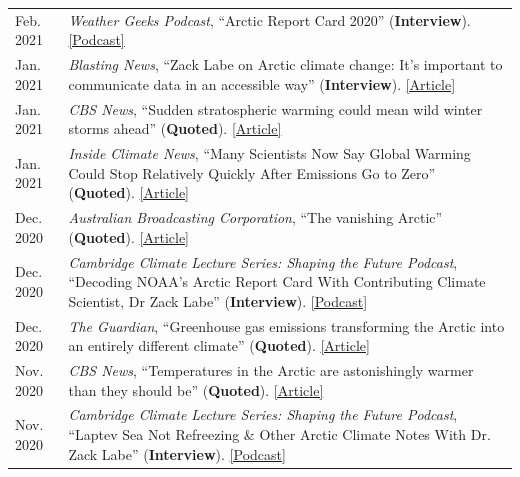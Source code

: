 \documentclass[margin,line,palatino,courier,10pt]{res}
\begin{document}
\begin{resume}
\begin{tabular}{@{}p{0.9in}p{4in}}
Feb. 2021 & \textit{Weather Geeks Podcast}, ``Arctic Report Card 2020'' (\textbf{Interview}). \href{https://podcasts.apple.com/us/podcast/arctic-report-card-2020/id1373312240?i=1000507537964}{[Podcast]}\\
Jan. 2021 & \textit{Blasting News}, ``Zack Labe on Arctic climate change: It's important to communicate data in an accessible way'' (\textbf{Interview}). \href{https://us.blastingnews.com/opinion/2021/01/zack-labe-on-arctic-climate-change-its-important-to-communicate-data-in-an-accessible-way-003267614.html}{[Article]}\\
Jan. 2021 & \textit{CBS News}, ``Sudden stratospheric warming could mean wild winter storms ahead'' (\textbf{Quoted}). \href{https://www.cbsnews.com/news/stratospheric-warming-winter-weather-coming/}{[Article]}\\
Jan. 2021 & \textit{Inside Climate News}, ``Many Scientists Now Say Global Warming Could Stop Relatively Quickly After Emissions Go to Zero'' (\textbf{Quoted}). \href{https://insideclimatenews.org/news/03012021/five-aspects-climate-change-2020/}{[Article]}\\
Dec. 2020 & \textit{Australian Broadcasting Corporation}, ``The vanishing Arctic'' (\textbf{Quoted}). \href{https://www.abc.net.au/news/2020-12-16/arctic-sea-ice-dramatic-transformation-as-seen-by-satellites/12961584?nw=0}{[Article]}\\
Dec. 2020 & \textit{Cambridge Climate Lecture Series: Shaping the Future Podcast}, ``Decoding NOAA's Arctic Report Card With Contributing Climate Scientist, Dr Zack Labe'' (\textbf{Interview}). \href{https://climateseries.com/climate-change-podcast/80-arctic-report-card-zack-labe}{[Podcast]}\\
Dec. 2020 & \textit{The Guardian}, ``Greenhouse gas emissions transforming the Arctic into an entirely different climate'' (\textbf{Quoted}). \href{https://www.theguardian.com/world/2020/dec/08/arctic-report-climate-crisis-wildfires-ice-loss}{[Article]}\\
Nov. 2020 & \textit{CBS News}, ``Temperatures in the Arctic are astonishingly warmer than they should be'' (\textbf{Quoted}). \href{https://www.cbsnews.com/news/climate-change-arctic-temperatures-warmer/}{[Article]}\\
Nov. 2020 & \textit{Cambridge Climate Lecture Series: Shaping the Future Podcast}, ``Laptev Sea Not Refreezing \& Other Arctic Climate Notes With Dr. Zack Labe'' (\textbf{Interview}). \href{https://climateseries.com/climate-change-podcast/74-dr-zack-labe-arctic-laptev-sea}{[Podcast]}\\

\end{tabular}
\end{resume}
\end{document}

